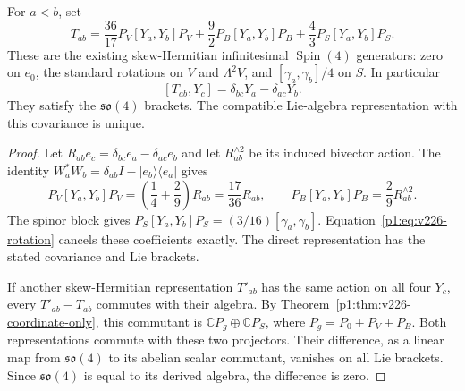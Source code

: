 \documentclass[11pt]{article}
\begin{document}
\begin{theorem}
\label{p1:thm:v226-rotations}
For $a<b$, set
\begin{equation}\label{p1:eq:v226-rotation}
 \boxed{T_{ab}=\frac{36}{17}P_V[Y_a,Y_b]P_V
               +\frac92P_B[Y_a,Y_b]P_B
               +\frac43P_S[Y_a,Y_b]P_S.}
\end{equation}
These are the existing skew-Hermitian infinitesimal $\operatorname{Spin}(4)$ generators:
zero on $e_0$, the standard rotations on $V$ and $\Lambda^2V$, and
$[\gamma_a,\gamma_b]/4$ on $S$. In particular
\[
 [T_{ab},Y_c]=\delta_{bc}Y_a-\delta_{ac}Y_b.
\]
They satisfy the $\mathfrak{so}(4)$ brackets. The compatible Lie-algebra
representation with this covariance is unique.
\end{theorem}
\begin{proof}
Let $R_{ab}e_c=\delta_{bc}e_a-\delta_{ac}e_b$ and let
$R_{ab}^{\wedge2}$ be its induced bivector action. The identity
$W_a^*W_b=\delta_{ab}I-|e_b\rangle\langle e_a|$ gives
\[
 P_V[Y_a,Y_b]P_V
 =\left(\frac14+\frac29\right)R_{ab}
 =\frac{17}{36}R_{ab},\qquad
 P_B[Y_a,Y_b]P_B=\frac29R_{ab}^{\wedge2}.
\]
The spinor block gives
$P_S[Y_a,Y_b]P_S=(3/16)[\gamma_a,\gamma_b]$.
Equation~\eqref{p1:eq:v226-rotation} cancels these coefficients exactly. The direct
representation has the stated covariance and Lie brackets.

If another skew-Hermitian representation $T'_{ab}$ has the same action on
all four $Y_c$, every $T'_{ab}-T_{ab}$ commutes with their algebra. By
Theorem~\ref{p1:thm:v226-coordinate-only}, this commutant is
$\mathbb{C} P_g\oplus\mathbb{C} P_S$, where $P_g=P_0+P_V+P_B$. Both representations
commute with these two projectors. Their difference, as a linear map from
$\mathfrak{so}(4)$ to its abelian scalar commutant, vanishes on all Lie
brackets. Since $\mathfrak{so}(4)$ is equal to its derived algebra, the
difference is zero.
\end{proof}
\end{document}
